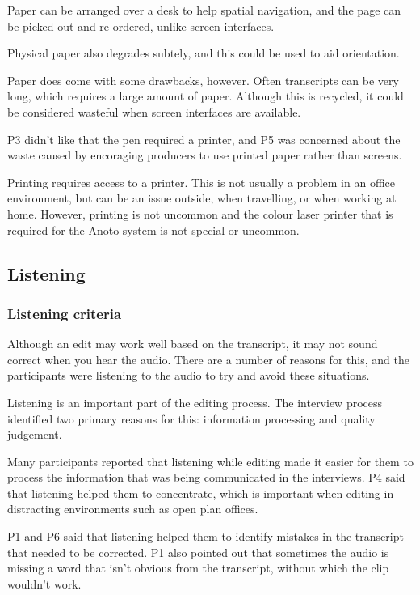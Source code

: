 Paper can be arranged over a desk to help spatial navigation, and the page can be picked out and re-ordered, unlike
screen interfaces.

Physical paper also degrades subtely, and this could be used to aid orientation.


Paper does come with some drawbacks, however. Often transcripts can be very long, which requires a large amount of
paper. Although this is recycled, it could be considered wasteful when screen interfaces are available.

P3 didn't like that the pen required a printer, and P5 was concerned about the waste caused by encoraging producers to
use printed paper rather than screens.

Printing requires access to a printer. This is not usually a problem in an office environment, but can be an issue
outside, when travelling, or when working at home. However, printing is not uncommon and the colour laser printer that
is required for the Anoto system is not special or uncommon.

\subsection{Listening}

\subsubsection{Listening criteria}

Although an edit may work well based on the transcript, it may not sound correct when you hear the audio. There are a
number of reasons for this, and the participants were listening to the audio to try and avoid these situations.

Listening is an important part of the editing process. The interview process identified two primary reasons for this:
information processing and quality judgement.


Many participants reported that listening while editing made it easier for them to process the information that was
being communicated in the interviews. P4 said that listening helped them to concentrate, which is important when
editing in distracting environments such as open plan offices.

P1 and P6 said that listening helped them to identify mistakes in the transcript that needed to be corrected. P1 also
pointed out that sometimes the audio is missing a word that isn't obvious from the transcript, without which the clip
wouldn't work.


